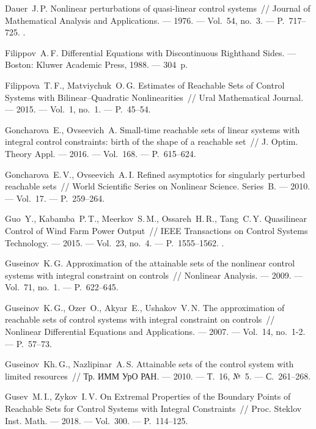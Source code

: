 \documentclass[../main.tex]{subfiles}
\begin{document}
\begin{thebibliography}{99}
Dauer~J.\,P. Nonlinear perturbations of quasi-linear control systems~// Journal of Mathematical Analysis and Applications. --- 1976. --- Vol.~54, no.~3. --- P.~717--725. 
.

Filippov~A.\,F. Differential Equations with Discontinuous Righthand Sides. --- Boston: Kluwer Academic Press, 1988. --- 304~p.

Filippova~T.\,F., Matviychuk~O.\,G. Estimates of Reachable Sets of Control Systems with Bilinear--Quadratic Nonlinearities~// Ural Mathematical Journal. --- 2015. --- Vol.~1, no.~1. --- P.~45--54. 
    
Goncharova~E., Ovseevich~A. Small-time reachable sets of linear systems with integral control constraints: birth of the shape of a reachable set~// J. Optim. Theory Appl. --- 2016. --- Vol.~168. --- P.~615--624.
  
Goncharova~E.\,V., Ovseevich~A.\,I. Refined asymptotics for singularly perturbed reachable sets~// World Scientific Series on Nonlinear Science. Series~B. --- 2010. --- Vol.~17. --- P.~259--264.

Guo~Y., Kabamba~P.\,T., Meerkov~S.\,M., Ossareh~H.\,R., Tang~C.\,Y. Quasilinear Control of Wind Farm Power Output~// IEEE Transactions on Control Systems Technology. --- 2015. --- Vol.~23, no.~4. --- P.~1555--1562.
.

Guseinov~K.\,G. Approximation of the attainable sets of the nonlinear control systems with integral constraint on controls~// Nonlinear Analysis. --- 2009. --- Vol.~71, no.~1. --- P.~622--645. 

Guseinov~K.\,G., Ozer~O., Akyar~E., Ushakov~V.\,N. The approximation of reachable sets of control systems with integral constraint on controls~// Nonlinear Differential Equations and Applications. --- 2007. --- Vol.~14, no.~1-2. --- P.~57--73.

Guseinov~Kh.\,G., Nazlipinar~A.\,S. Attainable sets of the control system with limited resources~// Тр. ИММ УрО РАН. --- 2010. --- Т.~16, №~5. --- С.~261--268.

Gusev~M.\,I., Zykov~I.\,V. On Extremal Properties of the Boundary Points of Reachable Sets for Control Systems with Integral Constraints~// Proc. Steklov Inst. Math. --- 2018. --- Vol.~300. --- P.~114--125.


\end{thebibliography}
\end{document}

